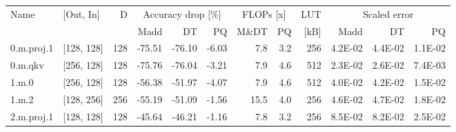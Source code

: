 \begin{table}
\centering
\begin{tabular}{llrrrrrrrrrr}
\toprule
Name & [Out, In] & D & \multicolumn{3}{|c|}{Accuracy drop [\%]} & \multicolumn{2}{|c|}{FLOPs [x]} & LUT & \multicolumn{3}{|c|}{Scaled error} \\
 &  &  & Madd & DT & PQ & M\&DT & PQ & [kB] & Madd & DT & PQ \\
\midrule
0.m.proj.1 & [128, 128] & 128 & {\cellcolor[HTML]{A70226}} \color[HTML]{F1F1F1} -75.51 & {\cellcolor[HTML]{A50026}} \color[HTML]{F1F1F1} -76.10 & {\cellcolor[HTML]{FAFDB8}} \color[HTML]{000000} -6.03 & 7.8 & 3.2 & 256 & {\cellcolor[HTML]{ECF7A6}} \color[HTML]{000000} 4.2E-02 & {\cellcolor[HTML]{EFF8AA}} \color[HTML]{000000} 4.4E-02 & {\cellcolor[HTML]{BFE47A}} \color[HTML]{000000} 1.1E-02 \\
0.m.qkv & [256, 128] & 128 & {\cellcolor[HTML]{A70226}} \color[HTML]{F1F1F1} -75.76 & {\cellcolor[HTML]{A50026}} \color[HTML]{F1F1F1} -76.04 & {\cellcolor[HTML]{F2FAAE}} \color[HTML]{000000} -3.21 & 7.9 & 4.6 & 512 & {\cellcolor[HTML]{D3EC87}} \color[HTML]{000000} 2.3E-02 & {\cellcolor[HTML]{D7EE8A}} \color[HTML]{000000} 2.6E-02 & {\cellcolor[HTML]{B9E176}} \color[HTML]{000000} 7.4E-03 \\
1.m.0 & [256, 128] & 128 & {\cellcolor[HTML]{E44C34}} \color[HTML]{F1F1F1} -56.38 & {\cellcolor[HTML]{ED5F3C}} \color[HTML]{F1F1F1} -51.97 & {\cellcolor[HTML]{F5FBB2}} \color[HTML]{000000} -4.07 & 7.9 & 4.6 & 512 & {\cellcolor[HTML]{EBF7A3}} \color[HTML]{000000} 4.0E-02 & {\cellcolor[HTML]{EEF8A8}} \color[HTML]{000000} 4.2E-02 & {\cellcolor[HTML]{C5E67E}} \color[HTML]{000000} 1.5E-02 \\
1.m.2 & [128, 256] & 256 & {\cellcolor[HTML]{E65036}} \color[HTML]{F1F1F1} -55.19 & {\cellcolor[HTML]{EF633F}} \color[HTML]{F1F1F1} -51.09 & {\cellcolor[HTML]{EEF8A8}} \color[HTML]{000000} -1.56 & 15.5 & 4.0 & 256 & {\cellcolor[HTML]{F2FAAE}} \color[HTML]{000000} 4.6E-02 & {\cellcolor[HTML]{F4FAB0}} \color[HTML]{000000} 4.7E-02 & {\cellcolor[HTML]{CBE982}} \color[HTML]{000000} 1.8E-02 \\
2.m.proj.1 & [128, 128] & 128 & {\cellcolor[HTML]{F67C4A}} \color[HTML]{F1F1F1} -45.64 & {\cellcolor[HTML]{F67A49}} \color[HTML]{F1F1F1} -46.21 & {\cellcolor[HTML]{ECF7A6}} \color[HTML]{000000} -1.16 & 7.8 & 3.2 & 256 & {\cellcolor[HTML]{FEE08B}} \color[HTML]{000000} 8.5E-02 & {\cellcolor[HTML]{FEE28F}} \color[HTML]{000000} 8.2E-02 & {\cellcolor[HTML]{D7EE8A}} \color[HTML]{000000} 2.5E-02 \\

\end{tabular}
\end{table}
